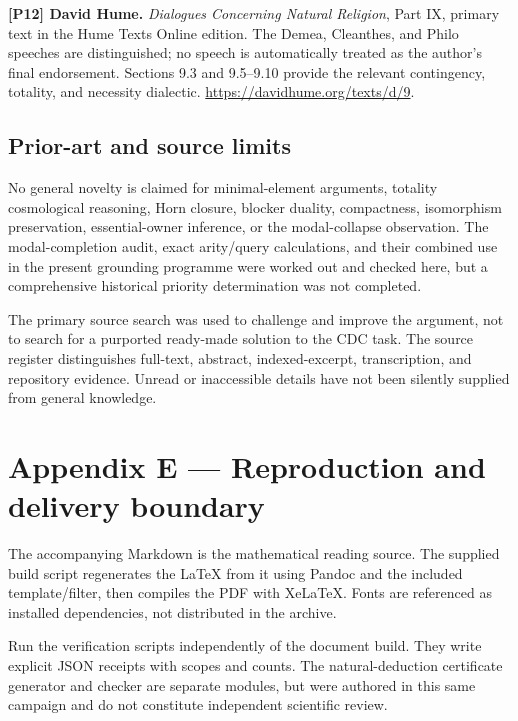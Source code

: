 \documentclass[11pt,a4paper]{article}
\begin{document}
\textbf{{[}P12{]} David Hume.} \emph{Dialogues Concerning Natural
Religion}, Part IX, primary text in the Hume Texts Online edition. The
Demea, Cleanthes, and Philo speeches are distinguished; no speech is
automatically treated as the author's final endorsement. Sections 9.3
and 9.5--9.10 provide the relevant contingency, totality, and necessity
dialectic. \url{https://davidhume.org/texts/d/9}.

\subsection*{Prior-art and source
limits}\label{prior-art-and-source-limits}

No general novelty is claimed for minimal-element arguments, totality
cosmological reasoning, Horn closure, blocker duality, compactness,
isomorphism preservation, essential-owner inference, or the
modal-collapse observation. The modal-completion audit, exact
arity/query calculations, and their combined use in the present
grounding programme were worked out and checked here, but a
comprehensive historical priority determination was not completed.

The primary source search was used to challenge and improve the
argument, not to search for a purported ready-made solution to the CDC
task. The source register distinguishes full-text, abstract,
indexed-excerpt, transcription, and repository evidence. Unread or
inaccessible details have not been silently supplied from general
knowledge.


\section*{Appendix E --- Reproduction and delivery
boundary}\label{appendix-e-reproduction-and-delivery-boundary}

The accompanying Markdown is the mathematical reading source. The
supplied build script regenerates the LaTeX from it using Pandoc and the
included template/filter, then compiles the PDF with XeLaTeX. Fonts are
referenced as installed dependencies, not distributed in the archive.

Run the verification scripts independently of the document build. They
write explicit JSON receipts with scopes and counts. The
natural-deduction certificate generator and checker are separate
modules, but were authored in this same campaign and do not constitute
independent scientific review.
\end{document}
